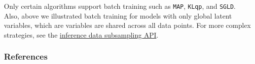 Only certain algorithms support batch training such as
\texttt{MAP}, \texttt{KLqp}, and \texttt{SGLD}. Also, above we
illustrated batch training for models with only global latent variables,
which are variables are shared across all data points.
For more complex strategies, see the
\href{http://edwardlib.org/api/inference-data-subsampling} {inference
data subsampling API}.

\subsubsection{References}\label{references}
